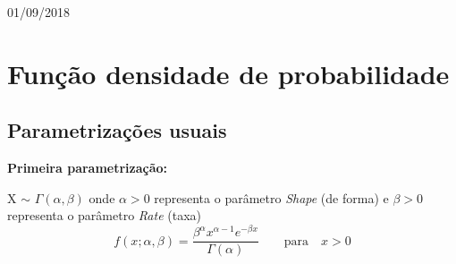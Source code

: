 \begin{titlepage}

{\large 01/09/2018}\\[2cm] %


 

\vfill %

\end{titlepage}


\section{Função densidade de probabilidade}


\subsection{Parametrizações usuais}

\textbf{Primeira parametrização:}

X $\sim$ \begin{math} \Gamma(\alpha, \beta) \end{math} onde \begin{math} \alpha > 0 \end{math} representa o parâmetro \textit{Shape} (de forma) e \begin{math} \beta > 0 \end{math} representa o parâmetro \textit{Rate} (taxa)
\begin{equation}
f(x; \alpha, \beta )=\frac{\beta^{\alpha}x^{\alpha-1}e^{-\beta x}}{\Gamma(\alpha)} \qquad \text{para} \quad x > 0 \label{eq:fdp1}
\end{equation}

